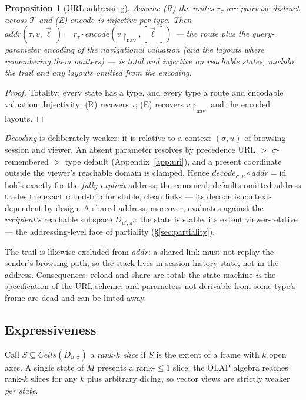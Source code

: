 \documentclass[11pt,a4paper]{article}
\newtheorem{proposition}{Proposition}[section]
\theoremstyle{remark}
\newcommand{\Cells}{\mathit{Cells}}
\newcommand{\TT}{\mathcal{T}}                    %
\newcommand{\addr}{\mathit{addr}}
\begin{document}
\begin{proposition}[URL addressing]\label{prop:addr}
Assume (R) the routes $r_\tau$ are pairwise distinct across $\TT$ and (E)
$\mathit{encode}$ is injective per type. Then
$\addr(\tau, v, \vec{\ell}\,) = r_\tau \cdot
\mathit{encode}(v\!\restriction_{\mathrm{nav}}, [\vec{\ell}\,])$ --- the route plus
the query-parameter encoding of the navigational valuation (and the layouts where
remembering them matters) --- is total and injective on reachable states, modulo
the trail and any layouts omitted from the encoding.
\end{proposition}

\begin{proof}
Totality: every state has a type, and every type a route and encodable valuation.
Injectivity: (R) recovers $\tau$; (E) recovers $v\!\restriction_{\mathrm{nav}}$
and the encoded layouts.
\end{proof}

\emph{Decoding} is deliberately weaker: it is relative to a context
$(\sigma, u)$ of browsing session and viewer. An absent parameter resolves by
precedence URL $>$ $\sigma$-remembered $>$ type default
(Appendix~\ref{app:uri}), and a present coordinate outside the viewer's
reachable domain is clamped. Hence $\mathit{decode}_{\sigma,u} \circ \addr =
\mathrm{id}$ holds exactly for the \emph{fully explicit} address; the canonical,
defaults-omitted address trades the exact round-trip for stable, clean links ---
its decode is context-dependent by design. A shared address, moreover, evaluates
against the \emph{recipient's} reachable subspace $D_{u',\pi'}$: the state is
stable, its extent viewer-relative --- the addressing-level face of partiality
(\S\ref{sec:partiality}).

The trail is likewise excluded from $\addr$: a shared link must not replay the
sender's browsing path, so the stack lives in session history state, not in the
address. Consequences: reload and share are total; the state machine \emph{is}
the specification of the URL scheme; and parameters not derivable from some
type's frame are dead and can be linted away.

\subsection{Expressiveness}\label{sec:express}

Call $S \subseteq \Cells(D_{u,\pi})$ a \emph{rank-$k$ slice} if $S$ is the extent of
a frame with $k$ open axes. A single state of $M$ presents a rank-$\le\!1$ slice;
the OLAP algebra reaches rank-$k$ slices for any $k$ plus arbitrary dicing, so
vector views are strictly weaker \emph{per state}.
\end{document}
